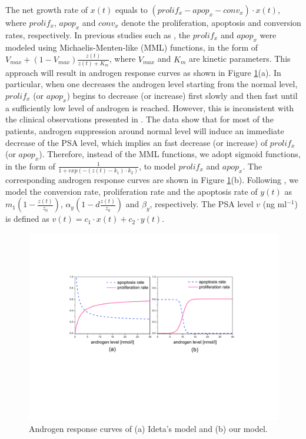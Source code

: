 The net growth rate of $x(t)$ equals to $(prolif_{x}-apop_{x}-conv_{x})\cdot x(t)$, where $prolif_x$, $apop_x$ and $conv_x$ denote the proliferation, apoptosis and conversion rates, respectively. In previous studies such as \cite{jackson04a,jackson04b,ideta08}, the $prolif_x$ and $apop_x$ were modeled using Michaelis-Menten-like (MML) functions, in the form of $V_{max}+(1-V_{max})\frac{z(t)}{z(t)+K_{m}}$, where $V_{max}$ and $K_m$ are kinetic parameters. This approach will result in androgen response curves as shown in Figure \ref{response}(a). In particular, when one decreases the androgen level starting from the normal level, $prolif_x$ (or $apop_x$) begins to decrease (or increase) first slowly and then fast until a sufficiently low level of androgen is reached. However, this is inconsistent with the clinical observations presented in \cite{bruchovsky06, bruchovsky07}. The data show that for most of the patients, androgen suppression around normal level will induce an immediate decrease of the PSA level, which implies an fast decrease (or increase) of $prolif_x$ (or $apop_x$). Therefore, instead of the MML functions, we adopt sigmoid functions, in the form of  $\frac{1}{1+exp(-(z(t)-k_1)\cdot k_2)}$, to model $prolif_x$ and $apop_x$. The corresponding androgen response curves are shown in Figure \ref{response}(b). Following \cite{ideta08}, we model the conversion rate, proliferation rate and the apoptosis rate of $y(t)$ as $m_1(1-\frac{z(t)}{z_0})$, $\alpha_y(1-d\frac{z(t)}{z_0})$ and $\beta_y$, respectively. The PSA level $v$ (ng ml$^{-1}$) is defined as $v(t)=c_1\cdot x(t)+c_2\cdot y(t)$. 

\begin{figure}[htb]
\centering
\includegraphics[scale=0.5]{fig-response}
\caption{Androgen response curves of (a) Ideta's model and (b) our model.}
\label{response}
 \vspace{-0.3cm}
\end{figure}



